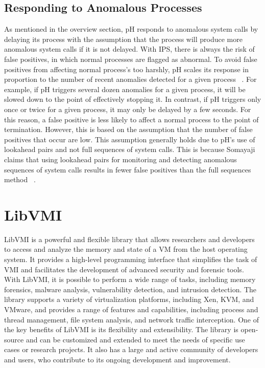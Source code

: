 \documentclass{report}
\begin{document}
\begin{spacing}{1.5}
\subsection{Responding to Anomalous Processes}


{\large
As mentioned in the overview section, pH responds to anomalous system calls by delaying its process with the assumption that the process will produce more anomalous system calls if it is not delayed. With IPS, there is always the risk of false positives, in which normal processes are flagged as abnormal. To avoid false positives from affecting normal process's too harshly, pH scales its response in proportion to the number of recent anomalies detected for a given process ~\cite{findlay2021practical}. For example, if pH triggers several dozen anomalies for a given process, it will be slowed down to the point of effectively stopping it. In contrast, if pH triggers only once or twice for a given process, it may only be delayed by a few seconds. For this reason, a false positive is less likely to affect a normal process to the point of termination. However, this is based on the assumption that the number of false positives that occur are low. This assumption generally holds due to pH's use of lookahead pairs and not full sequences of system calls. This is because Somayaji claims that using lookahead pairs for monitoring and detecting anomalous sequences of system calls results in fewer false positives than the full sequences method ~\cite{findlay2021practical}.
\leavevmode\newline
}






\section{LibVMI}


{\large
LibVMI is a powerful and flexible library that allows researchers and developers to access and analyze the memory and state of a VM from the host operating system. It provides a high-level programming interface that simplifies the task of VMI and facilitates the development of advanced security and forensic tools. With LibVMI, it is possible to perform a wide range of tasks, including memory forensics, malware analysis, vulnerability detection, and intrusion detection. The library supports a variety of virtualization platforms, including Xen, KVM, and VMware, and provides a range of features and capabilities, including process and thread management, file system analysis, and network traffic interception. One of the key benefits of LibVMI is its flexibility and extensibility. The library is open-source and can be customized and extended to meet the needs of specific use cases or research projects. It also has a large and active community of developers and users, who contribute to its ongoing development and improvement.
\newline    
}


\end{spacing}
\end{document}
